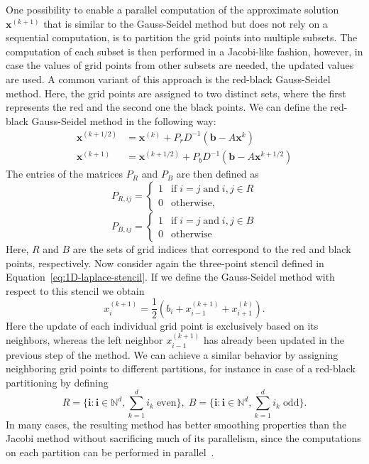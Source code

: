 One possibility to enable a parallel computation of the approximate solution $\bm{x}^{(k+1)}$ that is similar to the Gauss-Seidel method but does not rely on a sequential computation, is to partition the grid points into multiple subsets.
The computation of each subset is then performed in a Jacobi-like fashion, however, in case the values of grid points from other subsets are needed, the updated values are used.
A common variant of this approach is the red-black Gauss-Seidel method.
Here, the grid points are assigned to two distinct sets, where the first represents the red and the second one the black points.
We can define the red-black Gauss-Seidel method in the following way:
\begin{equation}
	\begin{split}
		\bm{x}^{(k+1/2)} & = \bm{x}^{(k)} + P_r D^{-1} (\bm{b} - A \bm{x}^{k}) \\
		\bm{x}^{(k+1)} & = \bm{x}^{(k+1/2)} + P_b D^{-1} (\bm{b} - A \bm{x}^{k+1/2})
	\end{split}
\end{equation}
The entries of the matrices $P_R$ and $P_B$ are then defined as
\begin{equation}
	P_{R,ij} = \begin{cases}
	1 & \text{if} \; i = j \; \text{and} \; i,j \in R \\
	0 & \text{otherwise},  
	\end{cases}
\end{equation}
\begin{equation}
	P_{B,ij} = \begin{cases}
		1 & \text{if} \; i = j \; \text{and} \; i,j \in B \\
		0 & \text{otherwise}  
	\end{cases}
\end{equation}
Here, $R$ and $B$ are the sets of grid indices that correspond to the red and black points, respectively.
Now consider again the three-point stencil defined in Equation~\eqref{eq:1D-laplace-stencil}.
If we define the Gauss-Seidel method with respect to this stencil we obtain
\begin{equation*}
	x_{i}^{(k+1)}=\frac {1}{2}\left(b_{i} + x_{i-1}^{(k+1)} + x_{i+1}^{(k)}\right).
\end{equation*}
Here the update of each individual grid point is exclusively based on its neighbors, whereas the left neighbor $x_{i-1}^{(k+1)}$ has already been updated in the previous step of the method.
We can achieve a similar behavior by assigning neighboring grid points to different partitions, for instance in case of a red-black partitioning by defining
\begin{equation}
		R = \{ \bm{i} : \bm{i} \in \mathbb{N}^d, \sum_{k=1}^d i_k \; \text{even} \}, \;
		B = \{ \bm{i} : \bm{i} \in \mathbb{N}^d, \sum_{k=1}^d i_k \; \text{odd} \}.
\end{equation}
In many cases, the resulting method has better smoothing properties than the Jacobi method without sacrificing much of its parallelism, since the computations on each partition can be performed in parallel~\cite{trottenberg2000multigrid}.
